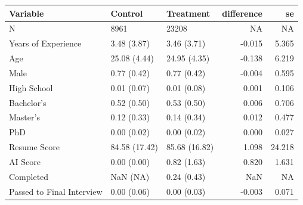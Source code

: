 
\begin{tabular}{l|l|l|r|r}
\hline
Variable & Control & Treatment & difference & se\\
\hline
N & 8961 & 23208 & NA & NA\\
\hline
Years of Experience & 3.48 (3.87) & 3.46 (3.71) & -0.015 & 5.365\\
\hline
Age & 25.08 (4.44) & 24.95 (4.35) & -0.138 & 6.219\\
\hline
Male & 0.77 (0.42) & 0.77 (0.42) & -0.004 & 0.595\\
\hline
High School & 0.01 (0.07) & 0.01 (0.08) & 0.001 & 0.106\\
\hline
Bachelor's & 0.52 (0.50) & 0.53 (0.50) & 0.006 & 0.706\\
\hline
Master's & 0.12 (0.33) & 0.14 (0.34) & 0.012 & 0.477\\
\hline
PhD & 0.00 (0.02) & 0.00 (0.02) & 0.000 & 0.027\\
\hline
Resume Score & 84.58 (17.42) & 85.68 (16.82) & 1.098 & 24.218\\
\hline
AI Score & 0.00 (0.00) & 0.82 (1.63) & 0.820 & 1.631\\
\hline
Completed & NaN (NA) & 0.24 (0.43) & NaN & NA\\
\hline
Passed to Final Interview & 0.00 (0.06) & 0.00 (0.03) & -0.003 & 0.071\\
\hline
\end{tabular}